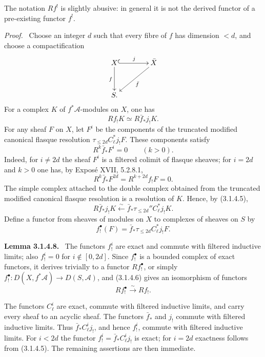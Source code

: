 \documentclass[12pt]{article}
\newcommand{\Aa}{\mathcal A}
\newenvironment{statement}[1]{\par\medskip\noindent\textbf{#1.}\ }{\par\medskip}
\newenvironment{prooftext}[1][Proof]{\par\noindent\emph{#1.}\ }{\par\medskip}
\begin{document}
The notation $Rf^!$ is slightly abusive: in general it is not the derived functor of a pre-existing functor $f^!$.

\begin{prooftext}
Choose an integer $d$ such that every fibre of $f$ has dimension $<d$, and choose a compactification
\[
\xymatrix@R=1.1cm@C=1.4cm{
X\ar@{^{(}->}[r]^j\ar[d]_f&\bar X\ar[ld]^{\bar f}\\
S.}
\]
For a complex $K$ of $f^*\Aa$-modules on $X$, one has
\[
   Rf_!K\simeq R\bar f_*j_!K.
\]
For any sheaf $F$ on $X$, let $F^i$ be the components of the truncated modified canonical flasque resolution $\tau_{\leq 2d}C^*_\ell j_!F$. These components satisfy
\begin{equation}
   R^k\bar f_*F^i=0\qquad(k>0). \tag{3.1.4.5}
\end{equation}
Indeed, for $i\ne 2d$ the sheaf $F^i$ is a filtered colimit of flasque sheaves; for $i=2d$ and $k>0$ one has, by Expos\'e XVII, 5.2.8.1,
\[
   R^k\bar f_*F^{2d}=R^{k+2d}f_!F=0.
\]
The simple complex attached to the double complex obtained from the truncated modified canonical flasque resolution is a resolution of $K$. Hence, by (3.1.4.5),
\begin{equation}
   R\bar f_*j_!K \xleftarrow{\sim} \bar f_*\tau_{\leq 2d}''C_\ell^*j_!K. \tag{3.1.4.6}
\end{equation}
Define a functor from sheaves of modules on $X$ to complexes of sheaves on $S$ by
\begin{equation}
   f_!^{\bullet}(F)=\bar f_*\tau_{\leq 2d}C_\ell^*j_!F. \tag{3.1.4.7}
\end{equation}

\begin{statement}{Lemma 3.1.4.8}
The functors $f_!^i$ are exact and commute with filtered inductive limits; also $f_!^i=0$ for $i\notin [0,2d]$. Since $f_!^{\bullet}$ is a bounded complex of exact functors, it derives trivially to a functor $Rf_!^{\bullet}$, or simply $f_!^{\bullet}:D(X,f^*\Aa)\to D(S,\Aa)$, and (3.1.4.6) gives an isomorphism of functors
\[
   Rf_!^{\bullet}\xrightarrow{\sim}Rf_!.
\]
\end{statement}

The functors $C^i_\ell$ are exact, commute with filtered inductive limits, and carry every sheaf to an acyclic sheaf. The functors $\bar f_*$ and $j_!$ commute with filtered inductive limits. Thus $\bar f_*C^i_\ell j_!$, and hence $f_!^i$, commute with filtered inductive limits. For $i<2d$ the functor $f_!^i=\bar f_*C_\ell^ij_!$ is exact; for $i=2d$ exactness follows from (3.1.4.5). The remaining assertions are then immediate.


\end{prooftext}
\end{document}
